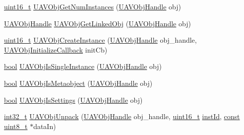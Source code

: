 \begin{DoxyCompactItemize}
\item 
\hyperlink{stdint_8h_a273cf69d639a59973b6019625df33e30}{uint16\-\_\-t} \hyperlink{group___u_a_v_gaf46561dd158afc452d998966f6b458ff}{U\-A\-V\-Obj\-Get\-Num\-Instances} (\hyperlink{group___n_a_m_e_gac31715ab50a1903838e7d87c8022ec75}{U\-A\-V\-Obj\-Handle} obj)
\item 
\hyperlink{group___n_a_m_e_gac31715ab50a1903838e7d87c8022ec75}{U\-A\-V\-Obj\-Handle} \hyperlink{group___u_a_v_gaacaedd750b121953b07323c74b6ee375}{U\-A\-V\-Obj\-Get\-Linked\-Obj} (\hyperlink{group___n_a_m_e_gac31715ab50a1903838e7d87c8022ec75}{U\-A\-V\-Obj\-Handle} obj)
\item 
\hyperlink{stdint_8h_a273cf69d639a59973b6019625df33e30}{uint16\-\_\-t} \hyperlink{group___u_a_v_gac892e6dac1fb6de05ed730aa15b65a65}{U\-A\-V\-Obj\-Create\-Instance} (\hyperlink{group___n_a_m_e_gac31715ab50a1903838e7d87c8022ec75}{U\-A\-V\-Obj\-Handle} obj\-\_\-handle, \hyperlink{group___u_a_v_ga16def10911b9b7e8626c2d1e3fec6e67}{U\-A\-V\-Obj\-Initialize\-Callback} init\-Cb)
\item 
\hyperlink{group___exported__types_gaf6a258d8f3ee5206d682d799316314b1}{bool} \hyperlink{group___u_a_v_ga4445147a5fb5e410605f364b66d9209e}{U\-A\-V\-Obj\-Is\-Single\-Instance} (\hyperlink{group___n_a_m_e_gac31715ab50a1903838e7d87c8022ec75}{U\-A\-V\-Obj\-Handle} obj)
\item 
\hyperlink{group___exported__types_gaf6a258d8f3ee5206d682d799316314b1}{bool} \hyperlink{group___u_a_v_gadd349b0b23fc3be72cbde98e5fcfaec2}{U\-A\-V\-Obj\-Is\-Metaobject} (\hyperlink{group___n_a_m_e_gac31715ab50a1903838e7d87c8022ec75}{U\-A\-V\-Obj\-Handle} obj)
\item 
\hyperlink{group___exported__types_gaf6a258d8f3ee5206d682d799316314b1}{bool} \hyperlink{group___u_a_v_gac4a7f32aa7aa97b0e891a0fecaa2e335}{U\-A\-V\-Obj\-Is\-Settings} (\hyperlink{group___n_a_m_e_gac31715ab50a1903838e7d87c8022ec75}{U\-A\-V\-Obj\-Handle} obj)
\item 
\hyperlink{group___n_a_m_e_gafd12020da5a235dfcf0c3c748fb5baed}{int32\-\_\-t} \hyperlink{group___u_a_v_gae54216880f0d6f603497b8fad60d0c95}{U\-A\-V\-Obj\-Unpack} (\hyperlink{group___n_a_m_e_gac31715ab50a1903838e7d87c8022ec75}{U\-A\-V\-Obj\-Handle} obj\-\_\-handle, \hyperlink{stdint_8h_a273cf69d639a59973b6019625df33e30}{uint16\-\_\-t} \hyperlink{group___n_a_m_e_ga874457c6d2526c90ec75fa5a37d687ca}{inst\-Id}, \hyperlink{group___n_a_m_e_ga7ae6d0e43244213b34de2c2b9aa30da6}{const} \hyperlink{stdint_8h_aba7bc1797add20fe3efdf37ced1182c5}{uint8\-\_\-t} $\ast$data\-In)
\item 

\end{DoxyCompactItemize}
